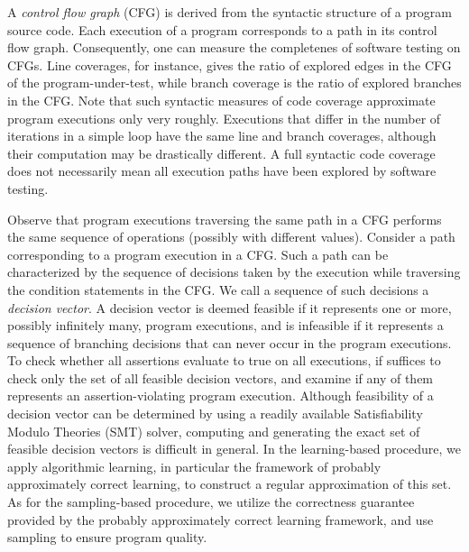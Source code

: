 A \emph{control flow graph} (CFG) is derived from the syntactic structure of a program source code. Each execution of a program corresponds to a path in its control flow graph. Consequently, one can measure the completenes of software testing on CFGs. Line coverages, for instance, gives the ratio of explored edges in the CFG of the program-under-test, while branch coverage is the ratio of explored branches in the CFG. Note that such syntactic measures of code coverage approximate program executions only very roughly. Executions that differ in the number of iterations in a simple loop have the same line and branch coverages, although their computation may be drastically different. A full syntactic code coverage does not necessarily mean all execution paths have been explored by software testing.

Observe that program executions traversing the same path in a CFG performs the same sequence of operations (possibly with different values). Consider a path corresponding to a program execution in a CFG. Such a path can be characterized by the sequence of decisions taken by the execution while traversing the condition statements in the CFG. We call a sequence of such decisions a \emph{decision vector}. A decision vector is deemed feasible if it represents one or more, possibly infinitely many, program executions, and is infeasible if it represents a sequence of branching decisions that can never occur in the program executions. To check whether all assertions evaluate to true on all executions, if suffices to check only the set of all feasible decision vectors, and examine if any of them represents an assertion-violating program execution. Although feasibility of a decision vector can be determined by using a readily available Satisfiability Modulo Theories (SMT) solver, computing and generating the exact set of feasible decision vectors is difficult in general. In the learning-based procedure, we apply algorithmic learning, in particular the framework of probably approximately correct learning, to construct a regular approximation of this set. As for the sampling-based procedure, we utilize the correctness guarantee provided by the probably approximately correct learning framework, and use sampling to ensure program quality. 

